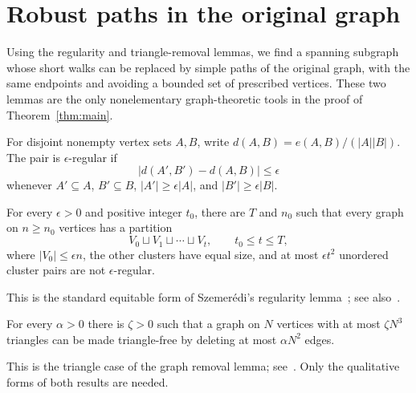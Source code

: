 \section{Robust paths in the original graph}\label{sec:cleanup}
Using the regularity and triangle-removal lemmas, we find a spanning subgraph whose short walks can be replaced by simple paths of the original graph, with the same endpoints and avoiding a bounded set of prescribed vertices. These two lemmas are the only nonelementary graph-theoretic tools in the proof of Theorem~\ref{thm:main}.

For disjoint nonempty vertex sets $A,B$, write $d(A,B)=e(A,B)/(|A||B|)$. The pair is $\epsilon$-regular if
\[
 |d(A',B')-d(A,B)|\le\epsilon
\]
whenever $A'\subseteq A$, $B'\subseteq B$, $|A'|\ge\epsilon|A|$, and $|B'|\ge\epsilon|B|$.

\begin{theorem}\label{thm:regularity}
For every $\epsilon>0$ and positive integer $t_0$, there are $T$ and $n_0$ such that every graph on $n\ge n_0$ vertices has a partition
\[
 V_0\sqcup V_1\sqcup\cdots\sqcup V_t,
 \qquad t_0\le t\le T,
\]
where $|V_0|\le\epsilon n$, the other clusters have equal size, and at most $\epsilon t^2$ unordered cluster pairs are not $\epsilon$-regular.
\end{theorem}
This is the standard equitable form of Szemer\'edi's regularity lemma~\cite{Szemeredi1978}; see also~\cite{ConlonFox2012}.

\begin{theorem}\label{thm:removal}
For every $\alpha>0$ there is $\zeta>0$ such that a graph on $N$ vertices with at most $\zeta N^3$ triangles can be made triangle-free by deleting at most $\alpha N^2$ edges.
\end{theorem}
This is the triangle case of the graph removal lemma; see~\cite{Fox2011}. Only the qualitative forms of both results are needed.

